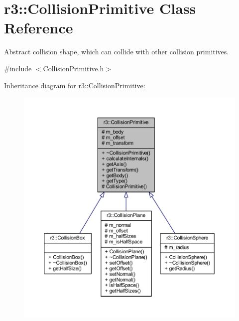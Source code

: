\hypertarget{classr3_1_1_collision_primitive}{}\section{r3\+:\+:Collision\+Primitive Class Reference}
\label{classr3_1_1_collision_primitive}


Abstract collision shape, which can collide with other collision primitives.  




{\ttfamily \#include $<$Collision\+Primitive.\+h$>$}



Inheritance diagram for r3\+:\+:Collision\+Primitive\+:\nopagebreak
\begin{figure}[H]
\begin{center}
\leavevmode
\includegraphics[width=350pt]{classr3_1_1_collision_primitive__inherit__graph}
\end{center}
\end{figure}


